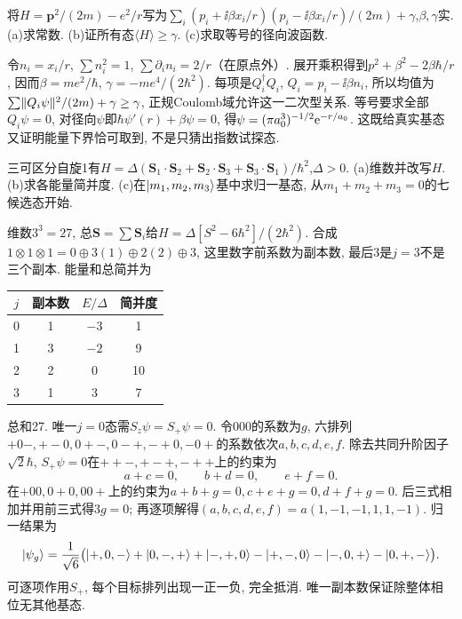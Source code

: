 \begin{exercise}
将$H=\boldsymbol p^2/(2m)-e^2/r$写为$\sum_i(p_i+\ii\beta x_i/r)(p_i-\ii\beta x_i/r)/(2m)+\gamma$,$\beta,\gamma$实. (a)求常数. (b)证所有态$\langle H\rangle\geq\gamma$. (c)求取等号的径向波函数.
\end{exercise}
\begin{solution}
令$n_i=x_i/r$, $\sum n_i^2=1$, $\sum\partial_i n_i=2/r$（在原点外）. 展开乘积得到$p^2+\beta^2-2\beta\hbar/r$, 因而$\beta=me^2/\hbar$, $\gamma=-me^4/(2\hbar^2)$. 每项是$Q_i^\dagger Q_i$, $Q_i=p_i-\ii\beta n_i$, 所以均值为$\sum\lVert Q_i\psi\rVert^2/(2m)+\gamma\geq\gamma$, 正规Coulomb域允许这一二次型关系. 等号要求全部$Q_i\psi=0$, 对径向$\psi$即$\hbar\psi'(r)+\beta\psi=0$, 得$\psi=(\pi a_0^3)^{-1/2}\mathrm e^{-r/a_0}$. 这既给真实基态又证明能量下界恰可取到, 不是只猜出指数试探态.
\end{solution}
\begin{exercise}
三可区分自旋1有$H=\Delta(\boldsymbol S_1\cdot\boldsymbol S_2+\boldsymbol S_2\cdot\boldsymbol S_3+\boldsymbol S_3\cdot\boldsymbol S_1)/\hbar^2$,$\Delta>0$. (a)维数并改写$H$. (b)求各能量简并度. (c)在$\lvert m_1,m_2,m_3\rangle$基中求归一基态, 从$m_1+m_2+m_3=0$的七候选态开始.
\end{exercise}
\begin{solution}
维数$3^3=27$, 总$\boldsymbol S=\sum\boldsymbol S_i$给$H=\Delta[S^2-6\hbar^2]/(2\hbar^2)$. 合成$1\otimes1\otimes1=0\oplus3(1)\oplus2(2)\oplus3$, 这里数字前系数为副本数, 最后3是$j=3$不是三个副本. 能量和总简并为
\begin{center}\begin{tabular}{cccc}\toprule $j$&副本数&$E/\Delta$&简并度\\\midrule0&1&$-3$&1\\1&3&$-2$&9\\2&2&0&10\\3&1&3&7\\\bottomrule\end{tabular}\end{center}
总和27. 唯一$j=0$态需$S_z\psi=S_+\psi=0$. 令000的系数为$g$, 六排列$+0-,+-0,0+-,0-+,-+0,-0+$的系数依次$a,b,c,d,e,f$. 除去共同升阶因子$\sqrt2\hbar$, $S_+\psi=0$在$++-,+-+,-++$上的约束为
\[
a+c=0,\qquad b+d=0,\qquad e+f=0.
\]
在$+00,0+0,00+$上的约束为$a+b+g=0,c+e+g=0,d+f+g=0$. 后三式相加并用前三式得$3g=0$; 再逐项解得$(a,b,c,d,e,f)=a(1,-1,-1,1,1,-1)$. 归一结果为
\[
\lvert \psi_g\rangle=\frac1{\sqrt6}\bigl(\lvert +,0,-\rangle+\lvert 0,-,+\rangle+\lvert -,+,0\rangle
-\lvert +,-,0\rangle-\lvert -,0,+\rangle-\lvert 0,+,-\rangle\bigr).
\]
可逐项作用$S_+$, 每个目标排列出现一正一负, 完全抵消. 唯一副本数保证除整体相位无其他基态.
\end{solution}
